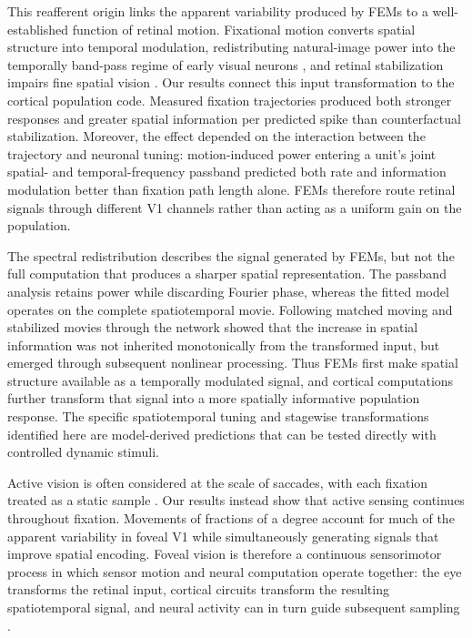\documentclass{lite}
\begin{document}
This reafferent origin links the apparent variability produced by FEMs to a well-established function of retinal motion. Fixational motion converts spatial structure into temporal modulation, redistributing natural-image power into the temporally band-pass regime of early visual neurons \cite{rucci2005fixational,kuang2012temporal}, and retinal stabilization impairs fine spatial vision \cite{rucci2007miniature,intoy2020finely}. Our results connect this input transformation to the cortical population code. Measured fixation trajectories produced both stronger responses and greater spatial information per predicted spike than counterfactual stabilization. Moreover, the effect depended on the interaction between the trajectory and neuronal tuning: motion-induced power entering a unit's joint spatial- and temporal-frequency passband predicted both rate and information modulation better than fixation path length alone. FEMs therefore route retinal signals through different V1 channels rather than acting as a uniform gain on the population.

The spectral redistribution describes the signal generated by FEMs, but not the full computation that produces a sharper spatial representation. The passband analysis retains power while discarding Fourier phase, whereas the fitted model operates on the complete spatiotemporal movie. Following matched moving and stabilized movies through the network showed that the increase in spatial information was not inherited monotonically from the transformed input, but emerged through subsequent nonlinear processing. Thus FEMs first make spatial structure available as a temporally modulated signal, and cortical computations further transform that signal into a more spatially informative population response. The specific spatiotemporal tuning and stagewise transformations identified here are model-derived predictions that can be tested directly with controlled dynamic stimuli.

Active vision is often considered at the scale of saccades, with each fixation treated as a static sample \cite{ballard1991animate,najemnik2005optimal,butko2010infomax,yang2016theoretical}. Our results instead show that active sensing continues throughout fixation. Movements of fractions of a degree account for much of the apparent variability in foveal V1 while simultaneously generating signals that improve spatial encoding. Foveal vision is therefore a continuous sensorimotor process in which sensor motion and neural computation operate together: the eye transforms the retinal input, cortical circuits transform the resulting spatiotemporal signal, and neural activity can in turn guide subsequent sampling \cite{vonholst1950reafferenzprinzip,gibson2014ecological,ahissar2016perception}.
\end{document}
